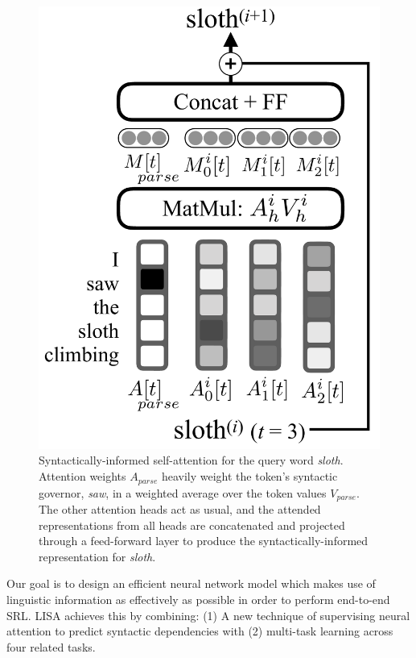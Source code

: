 \documentclass[11pt,a4paper]{article}
\newcommand{\todo}[1]{\textcolor{red}{TODO: #1}}
\begin{document}
\begin{figure}[t]
\begin{center}
\includegraphics[scale=.24]{attention-keynote}
\caption{Syntactically-informed self-attention for the query word \emph{sloth}. Attention weights $A_{parse}$ heavily weight the token's syntactic governor, \emph{saw}, in a weighted average over the token values $V_{parse}$. The other attention heads act as usual, and the attended representations from all heads are concatenated and projected through a feed-forward layer to produce the syntactically-informed representation for \emph{sloth}. \label{attention-fig}}
\end{center}
\end{figure}

Our goal is to design an efficient neural network model which makes use of linguistic information as effectively as possible in order to perform end-to-end SRL. LISA achieves this by combining: (1) A new technique of supervising neural attention to predict syntactic dependencies with (2) multi-task learning across four related tasks. 
\end{document}
